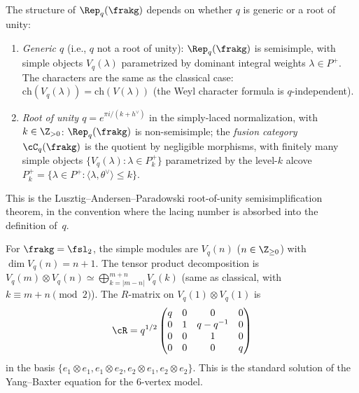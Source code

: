 \begin{proposition}
\label{prop:semisimplicity-dichotomy}
The structure of $\Rep_q(\frakg)$ depends on whether $q$ is generic
or a root of unity:
\begin{enumerate}[label=(\roman*)]
 \item \emph{Generic $q$} (i.e., $q$ not a root of unity):
 $\Rep_q(\frakg)$ is semisimple, with simple objects $V_q(\lambda)$
 parametrized by dominant integral weights $\lambda \in P^+$.
 The characters are the same as the classical case:
 $\mathrm{ch}(V_q(\lambda)) = \mathrm{ch}(V(\lambda))$
 (the Weyl character formula is $q$-independent).
 \item \emph{Root of unity $q = e^{\pi i/(k+h^\vee)}$} in the
 simply-laced normalization, with
 $k \in \Z_{>0}$: $\Rep_q(\frakg)$ is non-semisimple; the
 \emph{fusion category} $\cC_q(\frakg)$ is the quotient by
 negligible morphisms, with finitely many simple objects
 $\{V_q(\lambda) : \lambda \in P^+_k\}$ parametrized by the
 level-$k$ alcove $P^+_k = \{\lambda \in P^+ :
 \langle \lambda, \theta^\vee \rangle \leq k\}$.
\end{enumerate}
This is the Lusztig--Andersen--Paradowski root-of-unity
semisimplification theorem, in the convention where the lacing number
is absorbed into the definition of~$q$.
\end{proposition}

\begin{example}
\label{ex:sl2-generic}
For $\frakg = \fsl_2$, the simple modules are
$V_q(n)$ ($n \in \Z_{\geq 0}$) with $\dim V_q(n) = n+1$. The
tensor product decomposition is
$V_q(m) \otimes V_q(n) \simeq \bigoplus_{k=|m-n|}^{m+n} V_q(k)$
(same as classical, with $k \equiv m+n \pmod{2}$). The $R$-matrix
on $V_q(1) \otimes V_q(1)$ is
\[
 \cR = q^{1/2}
 \begin{pmatrix}
 q & 0 & 0 & 0 \\
 0 & 1 & q - q^{-1} & 0 \\
 0 & 0 & 1 & 0 \\
 0 & 0 & 0 & q
 \end{pmatrix}
\]
in the basis $\{e_1 \otimes e_1, e_1 \otimes e_2,
e_2 \otimes e_1, e_2 \otimes e_2\}$. This is the standard
solution of the Yang--Baxter equation for the 6-vertex model.
\end{example}

